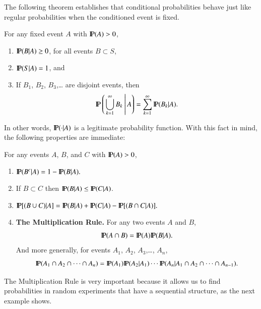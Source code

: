 \documentclass[captions=tableheading]{scrbook}
\begin{document}
The following theorem establishes that conditional probabilities behave just like regular probabilities when the conditioned event is fixed. 

\begin{thm}
For any fixed event \(A\) with \(\P(A)>0\),
\begin{enumerate}
\item \( \P (B|A)\geq 0 \), for all events \( B \subset S\),
\item \( \P (S|A) = 1 \), and
\item If \(B_{1}\), \(B_{2}\), \(B_{3}\),\ldots{} are disjoint events, then
  \begin{equation}
  \P\left(\left.\bigcup_{k=1}^{\infty}B_{k}\:\right|A\right)=\sum_{k=1}^{\infty}\P(B_{k}|A).
  \end{equation}
\end{enumerate}

\end{thm}
In other words, \(\P(\cdot|A)\) is a legitimate probability function. With this fact in mind, the following properties are immediate:

\begin{prop}
For any events \(A\), \(B\), and \(C\) with \(\P(A)>0\),

\begin{enumerate}
\item \( \P ( B^{c} | A ) = 1 - \P (B|A).\)
\item If \(B\subset C\) then \(\P(B|A)\leq\P(C|A)\).
\item \( \P [ ( B\cup C ) | A ] = \P (B|A) + \P(C|A) - \P [ (B \cap C|A) ].\)
\item \textbf{The Multiplication Rule.} For any two events \(A\) and \(B\),
  \begin{equation}
  \P(A\cap B)=\P(A)\P(B|A).\label{eq:multiplication-rule-short}
  \end{equation}
  And more generally, for events \(A_{1}\), \(A_{2}\), \(A_{3}\),\ldots{}, \(A_{n}\),
  \begin{equation}
  \P(A_{1}\cap A_{2}\cap\cdots\cap A_{n})=\P(A_{1})\P(A_{2}|A_{1})\cdots\P(A_{n}|A_{1}\cap A_{2}\cap\cdots\cap A_{n-1}).\label{eq:multiplication-rule-long}
  \end{equation}
\end{enumerate}
\end{prop}
The Multiplication Rule is very important because it allows us to find probabilities in random experiments that have a sequential structure, as the next example shows. 
\end{document}
